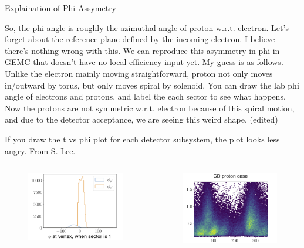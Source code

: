 \documentclass[aspectratio=169]{beamer}
\begin{document}
\begin{frame}{Explaination of Phi Assymetry}
 \footnotesize{ So, the phi angle is roughly the azimuthal angle of proton w.r.t. electron. Let’s forget about the reference plane defined by the incoming electron.
I believe there’s nothing wrong with this. We can reproduce this asymmetry in phi in GEMC that doesn’t have no local efficiency input yet.
My guess is as follows. Unlike the electron mainly moving straightforward, proton not only moves in/outward by torus, but only moves spiral by solenoid. You can draw the lab phi angle of electrons and protons, and label the each sector to see what happens. Now the protons are not symmetric w.r.t. electron because of this spiral motion, and due to the detector acceptance, we are seeing this weird shape. (edited)

If you draw the t vs phi plot for each detector subsystem, the plot looks less angry.
From S. Lee.}
\begin{columns}
        \begin{figure}
            \centering
            \includegraphics[width=.975\textwidth]{phiassym/phiassym1.png}
        \end{figure}
        \begin{figure}
            \centering
            \includegraphics[width=.975\textwidth]{phiassym/cdcase.png}
        \end{figure}
        

\end{columns}
\end{frame}
\end{document}
